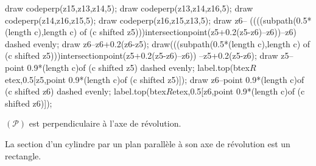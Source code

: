 \begin{propriete}
\begin{minipage}{0.5\linewidth}
\begin{center}
{\begin{Geometrie}[CoinBG={(-3u,-4u)},CoinHD={(6u,6u)}]
                draw codeperp(z15,z13,z14,5); draw codeperp(z13,z14,z16,5); draw codeperp(z14,z16,z15,5); draw codeperp(z16,z15,z13,5);
                draw z6-- ((((subpath(0.5*(length c),length c) of (c shifted z5)))intersectionpoint(z5+0.2(z5-z6)--z6))--z6) dashed evenly; draw z6--z6+0.2(z6-z5);
                draw(((subpath(0.5*(length c),length c) of (c shifted z5)))intersectionpoint(z5+0.2(z5-z6)--z6)) --z5+0.2(z5-z6);
                draw z5-- point 0.9*(length c)of (c shifted z5) dashed evenly; label.top(btex$R$etex,0.5[z5,point 0.9*(length c)of (c shifted z5)]);
                draw z6--point 0.9*(length c)of (c shifted z6) dashed evenly; label.top(btex$R$etex,0.5[z6,point 0.9*(length c)of (c shifted z6)]);
            \end{Geometrie}
            }
    
            $(\mathcal{P})$ est perpendiculaire à l'axe de révolution.
        \end{center}        
    \end{minipage}
    \begin{minipage}{0.5\linewidth}
        La section d'un cylindre par un plan parallèle à son axe de révolution est un rectangle.
    \end{minipage}
\end{propriete}


